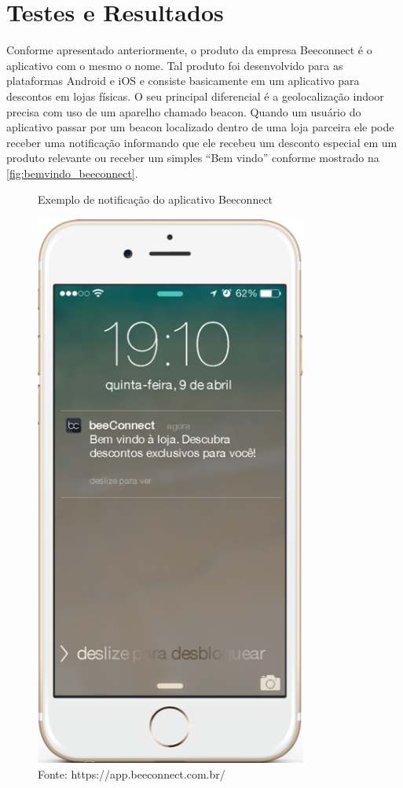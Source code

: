 \chapter{Testes e Resultados}
\label{cha:testes_e_resultados}
Conforme apresentado anteriormente, o produto da empresa Beeconnect é o aplicativo com o mesmo o nome. Tal produto foi desenvolvido para as plataformas Android e iOS e consiste basicamente em um aplicativo para descontos em lojas físicas. O seu principal diferencial é a geolocalização indoor precisa com uso de um aparelho chamado beacon. Quando um usuário do aplicativo passar por um beacon localizado dentro de uma loja parceira ele pode receber uma notificação informando que ele recebeu um desconto especial em um produto relevante ou receber um simples \enquote{Bem vindo} conforme mostrado na \autoref{fig:bemvindo_beeconnect}.

\begin{figure}[H]
\caption{Exemplo de notificação do aplicativo Beeconnect}
\centerline{\includegraphics[scale=0.35]{img/bemvindo_beeconnect}}
\label{fig:bemvindo_beeconnect}
\caption* {Fonte: https://app.beeconnect.com.br/}
\end{figure}

